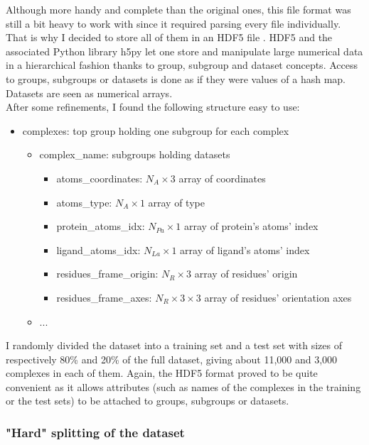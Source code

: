 \documentclass{article}
\begin{document}
Although more handy and complete than the original ones, this file format was still a bit heavy to work with since it required parsing every file individually. That is why I decided to store all of them in an HDF5 file \cite{HDF5}. HDF5 and the associated Python library h5py \cite{h5py} let one store and manipulate large numerical data in a hierarchical fashion thanks to group, subgroup and dataset concepts. Access to groups, subgroups or datasets is done as if they were values of a hash map. Datasets are seen as numerical arrays. \\
After some refinements, I found the following structure easy to use:
\begin{itemize}
    \item complexes: top group holding one subgroup for each complex
    \begin{itemize}
        \item complex\_name: subgroups holding datasets
        \begin{itemize}
            \item atoms\_coordinates: $N_A \times 3$ array of coordinates
            \item atoms\_type: $N_A \times 1$ array of type
            \item protein\_atoms\_idx: $N_{Pa} \times 1$ array of protein's atoms' index
            \item ligand\_atoms\_idx: $N_{La} \times 1$ array of ligand's atoms' index
            \item residues\_frame\_origin: $N_R \times 3$ array of residues' origin
            \item residues\_frame\_axes: $N_R \times 3 \times 3$ array of residues' orientation axes
        \end{itemize}
        \item ...
    \end{itemize}
\end{itemize}

I randomly divided the dataset into a training set and a test set with sizes of respectively 80\% and 20\% of the full dataset, giving about 11,000 and 3,000 complexes in each of them. Again, the HDF5 format proved to be quite convenient as it allows attributes (such as names of the complexes in the training or the test sets) to be attached to groups, subgroups or datasets.

\subsubsection{"Hard" splitting of the dataset}
\label{sec:hard}
\end{document}
